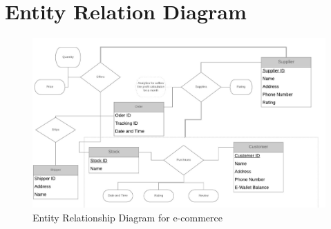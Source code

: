 \documentclass[a4paper,12pt]{article} %
\begin{document}
\section{Entity Relation Diagram}
\begin{figure}[H]
    \centering
    \includegraphics[width=1\textwidth]{ERD2} 
    \caption{Entity Relationship Diagram for e-commerce}
\end{figure}
\end{document}
